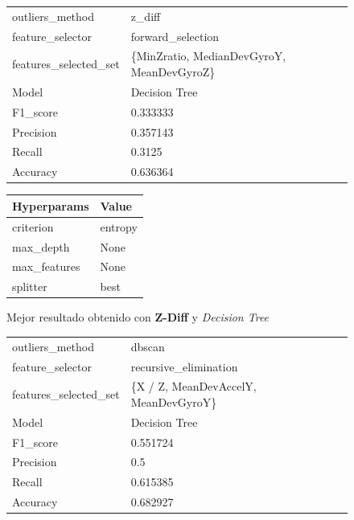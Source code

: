 \begin{appendices}
		\begin{figure}[htb]
			\centering
			\begin{tabular}{ll}
				\toprule
					  outliers\_method &                                    z\_diff \\
					 feature\_selector &                         forward\_selection \\
				features\_selected\_set & \{MinZratio, MedianDevGyroY, MeanDevGyroZ\} \\
								Model &                             Decision Tree \\
						F1\_score &                                  0.333333 \\
					   Precision &                                  0.357143 \\
						  Recall &                                    0.3125 \\
						Accuracy &                                  0.636364 \\
				\bottomrule
			\end{tabular}
			\newline
			\newline

			\begin{tabular}{ll}
				\toprule
				 Hyperparams &   Value \\
				\midrule
				   criterion & entropy \\
				   max\_depth &    None \\
				max\_features &    None \\
					splitter &    best \\
				\bottomrule
			\end{tabular}
			\caption{Mejor resultado obtenido con \textbf{Z-Diff} y \emph{Decision Tree}}
			\label{table:19}
		\end{figure}

		\begin{figure}[htb]
			\centering
			\begin{tabular}{ll}
				\toprule
					  outliers\_method &                               dbscan \\
					 feature\_selector &                recursive\_elimination \\
				features\_selected\_set & \{X / Z, MeanDevAccelY, MeanDevGyroY\} \\
								Model &                        Decision Tree \\
						F1\_score &                             0.551724 \\
					   Precision &                                  0.5 \\
						  Recall &                             0.615385 \\
						Accuracy &                             0.682927 \\
				\bottomrule
			\end{tabular}
			\newline
			\newline


\end{figure}
\end{appendices}
